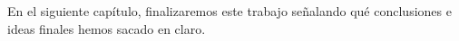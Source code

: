 En el siguiente capítulo, finalizaremos este trabajo señalando qué conclusiones e ideas finales hemos sacado en claro.






